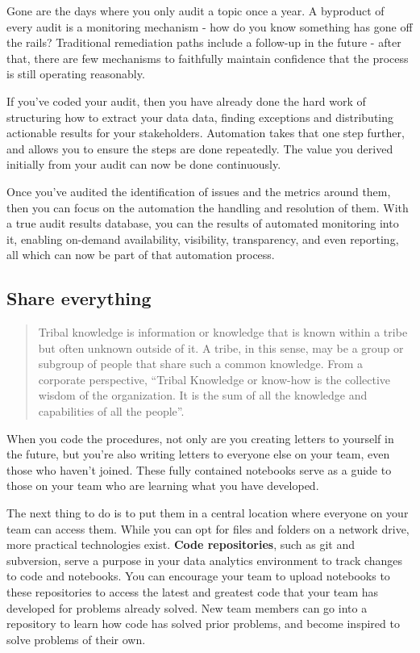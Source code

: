 \documentclass[
]{book}
\begin{document}
Gone are the days where you only audit a topic once a year. A byproduct of every audit is a monitoring mechanism - how do you know something has gone off the rails? Traditional remediation paths include a follow-up in the future - after that, there are few mechanisms to faithfully maintain confidence that the process is still operating reasonably.

If you've coded your audit, then you have already done the hard work of structuring how to extract your data data, finding exceptions and distributing actionable results for your stakeholders. Automation takes that one step further, and allows you to ensure the steps are done repeatedly. The value you derived initially from your audit can now be done continuously.

Once you've audited the identification of issues and the metrics around them, then you can focus on the automation the handling and resolution of them. With a true audit results database, you can the results of automated monitoring into it, enabling on-demand availability, visibility, transparency, and even reporting, all which can now be part of that automation process.

\hypertarget{share-everything}{%
\subsection{Share everything}\label{share-everything}}

\begin{quote}
Tribal knowledge is information or knowledge that is known within a tribe but often unknown outside of it. A tribe, in this sense, may be a group or subgroup of people that share such a common knowledge. From a corporate perspective, ``Tribal Knowledge or know-how is the collective wisdom of the organization. It is the sum of all the knowledge and capabilities of all the people''. \citep{tribal-knowledge}
\end{quote}

When you code the procedures, not only are you creating letters to yourself in the future, but you're also writing letters to everyone else on your team, even those who haven't joined. These fully contained notebooks serve as a guide to those on your team who are learning what you have developed.

The next thing to do is to put them in a central location where everyone on your team can access them. While you can opt for files and folders on a network drive, more practical technologies exist. \textbf{Code repositories}, such as git and subversion, serve a purpose in your data analytics environment to track changes to code and notebooks. You can encourage your team to upload notebooks to these repositories to access the latest and greatest code that your team has developed for problems already solved. New team members can go into a repository to learn how code has solved prior problems, and become inspired to solve problems of their own.
\end{document}
